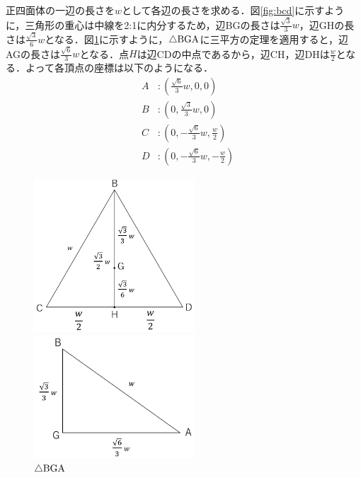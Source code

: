 \documentclass[]{jsarticle}
\begin{document}
正四面体の一辺の長さを$w$として各辺の長さを求める．図\ref{fig:bcd}に示すように，三角形の重心は中線を2:1に内分するため，辺BGの長さは$\frac{\sqrt{3}}{3}w$，辺GHの長さは$\frac{\sqrt{3}}{6}w$となる．図\ref{fig:bga}に示すように，$\triangle{\rm{BGA}}$に三平方の定理を適用すると，辺AGの長さは$\frac{\sqrt{6}}{3}w$となる．点$H$は辺CDの中点であるから，辺CH，辺DHは$\frac{w}{2}$となる．よって各頂点の座標は以下のようになる．
\begin{eqnarray*}
		&A&:(\frac{\sqrt{6}}{3}w, 0, 0) \\
		&B&:(0, \frac{\sqrt{3}}{3}w, 0)\\
		&C&:(0, -\frac{\sqrt{6}}{3}w, \frac{w}{2})\\
		&D&:(0, -\frac{\sqrt{6}}{3}w, -\frac{w}{2}) 
\end{eqnarray*}

\begin{figure}[htbp]
\begin{center}
\begin{minipage}[b]{0.45\textwidth}
  \begin{center}
    \includegraphics[width=6cm,keepaspectratio]{BCD.jpg}
    \caption{$\triangle{\rm{BCD}}$}
    \label{fig:bcd}
  \end{center}
\end{minipage}
\begin{minipage}[b]{0.45\textwidth}
  \begin{center}
    \includegraphics[width=6cm,keepaspectratio]{BGA.jpg}
    \caption{$\triangle{\rm{BGA}}$}
    \label{fig:bga}
  \end{center}
\end{minipage}
\end{center}
\end{figure}
\end{document}
